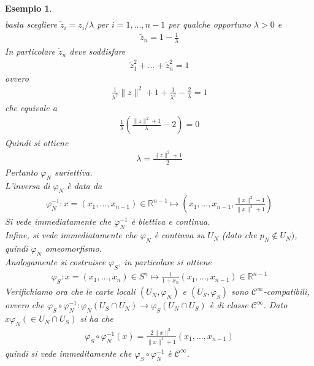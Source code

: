 \documentclass[oneside, 11pt]{amsbook}
\newcommand{\C}{\mathcal{C}}
\newcommand{\R}{\mathbb{R}}
\newcommand{\vp}{\varphi}
\newcommand{\wtz}{{\widetilde{z}}}
\newcommand{\0}{{(0)}}
\newcommand{\3}{{(3)}}
\theoremstyle{colonplain}
\theoremstyle{colondefinition}
\newtheorem{ex}[thm]{Esempio}
\theoremstyle{colonremark}
\numberwithin{equation}{chapter}
\begin{document}
\begin{ex}
\begin{align}
    \end{align}
    basta scegliere $\wtz_i = z_i/\lambda$ per $i = 1, \dots, n - 1$ per qualche opportuno $\lambda > 0$ e
    \begin{align}
        \wtz_n = 1 - \frac{1}{\lambda}
    \end{align}
    In particolare $\wtz_n$ deve soddisfare
    \begin{align}
        \wtz_1^2 + \dots + \wtz_n^2 = 1
    \end{align}
    ovvero
    \begin{align}
        \frac{1}{\lambda^2}\|z\|^2 + 1 + \frac{1}{\lambda^2} - \frac{2}{\lambda} = 1
    \end{align}
    che equivale a
    \begin{align}
        \frac{1}{\lambda}\left(\frac{\|z\|^2 + 1}{\lambda} - 2\right) = 0
    \end{align}
    Quindi si ottiene
    \begin{align}
        \lambda = \frac{\|z\|^2 + 1}{2}
    \end{align}
    Pertanto $\vp_N$ suriettiva. \\
    L'inversa di $\vp_N$ è data da
    \begin{align}
        \vp_N^{-1} : x = (x_1, \dots, x_{n - 1}) \in \R^{n - 1} \mapsto \left(x_1, \dots, x_{n - 1}, \frac{\|x\|^2 - 1}{\|x\|^2 + 1}\right)
    \end{align}
    Si vede immediatamente che $\vp_N^{-1}$ è biettiva e continua. \\
    Infine, si vede immediatamente che $\vp_N$ è continua su $U_N$ (dato che $p_N \not\in U_N)$, quindi $\vp_N$ omeomorfismo. \\ 
    Analogamente si costruisce $\vp_S$, in particolare si ottiene
    \begin{align}
        \vp_S : x = (x_1, \dots, x_n) \in S^n \mapsto \frac{1}{1 + x_n}(x_1, \dots, x_{n - 1}) \in \R^{n - 1}
    \end{align}
    Verifichiamo ora che le carte locali $(U_N, \vp_N)$ e $(U_S, \vp_S)$ sono $\C^\infty$-compatibili, ovvero che $\vp_S \circ \vp_N^{-1} : \vp_N(U_S \cap U_N) \longrightarrow \vp_S(U_N \cap U_S)$ è di classe $\C^\infty$. Dato $x \vp_N(\in U_N \cap U_S)$ si ha che
    \begin{align}
        \vp_S \circ \vp_N^{-1}(x) = \frac{2\|x\|^2}{\|x\|^2 + 1}(x_1, \dots, x_{n - 1})
    \end{align}
    quindi si vede immeditamente che $\vp_S \circ \vp_N^{-1}$ è $\C^\infty$.
\end{ex}
\end{document}

